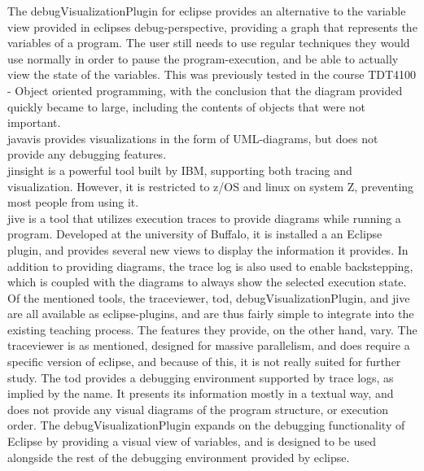 The \gls{debugVisualizationPlugin} for eclipse provides an alternative to the variable view provided in eclipses debug-perspective, providing a graph that represents the variables of a program.
The user still needs to use regular techniques they would use normally in order to pause the program-execution, and be able to actually view the state of the variables.
This was previously tested in the course TDT4100 - Object oriented programming, with the conclusion that the diagram provided quickly became to large, including the contents of objects that were not important.
~\\

\Gls{javavis} \cite{Oechsle2002} provides visualizations in the form of UML-diagrams, but does not provide any debugging features.
~\\

\Gls{jinsight} \cite{Pauw} is a powerful tool built by IBM, supporting both tracing and visualization.
However, it is restricted to z/OS and linux on system Z, preventing most people from using it.
~\\

\Gls{jive} is a tool that utilizes execution traces to provide diagrams while running a program.
Developed at the university of Buffalo, it is installed a an Eclipse plugin, and provides several new views to display the information it provides.
In addition to providing diagrams, the trace log is also used to enable backstepping, which is coupled with the diagrams to always show the selected execution state.
~\\

Of the mentioned tools, the \gls{traceviewer}, \gls{tod}, \gls{debugVisualizationPlugin}, and \gls{jive} are all available as eclipse-plugins, and are thus fairly simple to integrate into the existing teaching process.
The features they provide, on the other hand, vary.
The \gls{traceviewer} is as mentioned, designed for massive parallelism, and does require a specific version of eclipse, and because of this, it is not really suited for further study.%
The \gls{tod} provides a debugging environment supported by trace logs, as implied by the name.
It presents its information mostly in a textual way, and does not provide any visual diagrams of the program structure, or execution order.
The \gls{debugVisualizationPlugin} expands on the debugging functionality of Eclipse by providing a visual view of variables, and is designed to be used alongside the rest of the debugging environment provided by eclipse.
~\\

